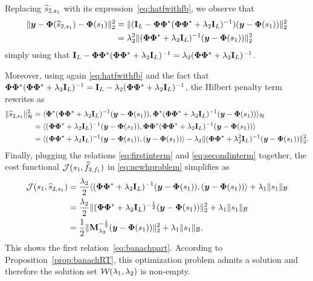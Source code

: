     Replacing $\widehat{s}_{2, s_1}$ with its expression~\eqref{eq:hatfwithfb}, we observe that
    \begin{align}
        \| \bm{y} - \bm{\Phi}( \widehat{s}_{2, s_1} ) - \bm{\Phi} (s_1) \|_2^2 &= 
        \| (\mathbf{I}_L - \bm{\Phi} \bm{\Phi}^*( \bm{\Phi} \bm{\Phi}^* + \lambda_{2} \mathbf{I}_L)^{-1}) ( \bm{y} - \bm{\Phi} (s_1) ) \|_2^2 \nonumber  \\
        &= \lambda_{2}^2 \| ( \bm{\Phi}\bm{\Phi}^* + \lambda_{2} \mathbf{I}_L)^{-1} (\bm{y} - \bm{\Phi}(s_1) ) \|_2^2 \label{eq:firstinterm}
    \end{align}
    simply using that $\mathbf{I}_L - \bm{\Phi}\bm{\Phi}^*( \bm{\Phi}\bm{\Phi}^* + \lambda_{2} \mathbf{I}_L)^{-1} = \lambda_{2} ( \bm{\Phi}\bm{\Phi}^* + \lambda_{2} \mathbf{I}_L)^{-1}$. 

    Moreover, using again \eqref{eq:hatfwithfb} and the fact that $\bm{\Phi}\bm{\Phi}^* ( \bm{\Phi}\bm{\Phi}^* + \lambda_{2} \mathbf{I}_L)^{-1} = \mathbf{I}_L - \lambda_{2} ( \bm{\Phi}\bm{\Phi}^* + \lambda_{2} \mathbf{I}_L)^{-1}$, the Hilbert penalty term rewrites as
    \begin{align}
        \|  \widehat{s}_{2, s_1}\|_{\mathcal{H}}^2 
        &=
        \langle \bm{\Phi}^* ( \bm{\Phi}\bm{\Phi}^* + \lambda_{2} \mathbf{I}_L)^{-1} ( \bm{y} - \bm{\Phi}(s_1) ) , \bm{\Phi}^* ( \bm{\Phi}\bm{\Phi}^* + \lambda_{2} \mathbf{I}_L)^{-1} ( \bm{y} -  \bm{\Phi} (s_1) ) \rangle_{\mathcal{H}} \nonumber \\
        &=
        \langle ( \bm{\Phi}\bm{\Phi}^* + \lambda_{2} \mathbf{I}_L)^{-1} ( \bm{y} - \bm{\Phi}(s_1) ) ,  \bm{\Phi} \bm{\Phi}^* ( \bm{\Phi} \bm{\Phi}^* + \lambda_{2} \mathbf{I}_L)^{-1} ( \bm{y} - \bm{\Phi}(s_1) ) \rangle \nonumber \\
        &= 
        \langle ( \bm{\Phi} \bm{\Phi}^* + \lambda_{2} \mathbf{I}_L)^{-1} ( \bm{y} - \bm{\Phi}(s_1) ) ,  ( \bm{y} - \bm{\Phi}(s_1) ) \rangle - \lambda_{2} \|( \bm{\Phi} \bm{\Phi}^* + \lambda_{2}^2 \mathbf{I}_L)^{-1} ( \bm{y} - \bm{\Phi}(s_1) ) \|_2^2.   \label{eq:secondinterm} 
    \end{align}
    Finally, plugging the relations \eqref{eq:firstinterm} and \eqref{eq:secondinterm} together,  the cost functional $\mathcal{J}(s_1, \widehat{f}_{2, f_1})$ in \eqref{eq:newhproblem} simplifies as
    \begin{align*}
        \mathcal{J}(s_1, \widehat{s}_{2, s_1}) &=  \frac{\lambda_{2}}{2} \langle ( \bm{\Phi} \bm{\Phi}^* + \lambda_{2} \mathbf{I}_L)^{-1} ( \bm{y} - \bm{\Phi}(s_1) ) ,  ( \bm{y} - \bm{\Phi}(s_1) ) \rangle + \lambda_{1} \|s_1\|_{\mathcal{B}} \nonumber \\
        &= \frac{\lambda_{2}}{2} \| ( \bm{\Phi} \bm{\Phi}^* + \lambda_{2} \mathbf{I}_L)^{-\frac{1}{2}} (\bm{y} - \bm{\Phi}(s_1) ) \|_2^2 + \lambda_{1} \|s_1\|_{\mathcal{B}} \\
        &= \frac{1}{2}\| \mathbf{M}_{\lambda_{2}}^{-\frac{1}{2}} (\bm{y} - \bm{\Phi}(s_1) ) \|_2^2 + \lambda_{1} \|s_1\|_{\mathcal{B}}.
    \end{align*}
    This shows the first relation~\eqref{eq:banachpart}. According to Proposition~\ref{prop:banachRT}, this optimization problem admits a solution and therefore the solution set $\mathcal{W} (\lambda_{1},\lambda_{2})$ is non-empty. 

